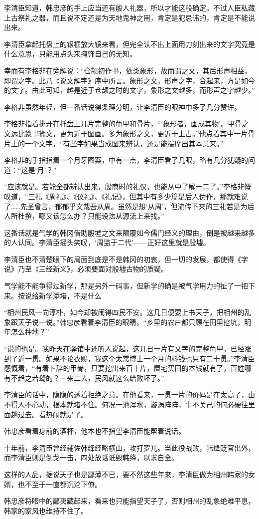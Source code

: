 李清臣知道，韩忠彦的手上应当还有殷人礼器，所以才能这般确定。不过人臣私藏上古祭礼之器，而且说不定还是为天地鬼神之用，肯定是犯忌讳的，肯定是不能说出来。

李清臣拿起托盘上的银框放大镜来看，但完全认不出上面用刀刻出来的文字究竟是什么意思，只能用点头来掩饰自己的无知。

幸而有李格非在旁解说：“仓颉初作书，依类象形，故而谓之文，其后形声相益，即谓之字。此乃《说文解字》序中所言。象形之文，形声之字，合起来，方是如今的文字。由此可知，越是近于仓颉之时的文字，象形之文越多，而形声之字越少。”

李格非虽然年轻，但一番话说得条理分明，让李清臣的眼神中多了几分赞许。

李格非指着排开在托盘上几片完整的龟甲和骨片，“‘象形者，画成其物’。甲骨之文远比篆书籀文，更为近于图画。多为象形之文，更近于上古。”他点着其中一片骨片上的一个文字，“有些字如果当成图来辨认，还是能揣摩出其本意来。”

李格非的手指指着一个月牙图案，中有一点，李清臣看了几眼，略有几分犹疑的问道：“这是‘月’？”

“应该就是。若能全都辨认出来，殷商时的礼仪，也能从中了解一二了。”李格非慨叹道，“三礼《周礼》、《仪礼》、《礼记》，但其中有多少篇是后人伪作，那就难说了……先圣曾言，郁郁乎文哉吾从周。虽然是想‘从周’，但流传下来的三礼若是为后人所杜撰，哪又该怎么办？只能设法从源流上来找。”

这番话就是气学的韩冈借助殷墟之文来颠覆如今儒门经义的理由，倒是被越来越多的人认同。李清臣摇头笑叹，‘周监于二代’——正好这里就是殷墟。

李清臣也不清楚眼下的局面到底是不是韩冈的初衷，但一切的发展，都使得《字说》乃至《三经新义》，必须要面对殷墟古物的质疑。

气学能不能争得过新学，那是另外一码事，但新学的确是被气学用力的扯了一把下来。按说给新学添堵，不是什么

“相州民风一向淳朴，如今却被闹得四民不安。这几日便要上书天子，把相州的乱象跟天子说一说。”韩忠彦看着李清臣的眼睛，“乡里的农户都只顾在田里挖坑，明年怎么种地？”

“说的也是。我昨天在驿馆中还听人说起，这几日一片有文字的完整龟甲，已经涨到了近一贯。如果不论衣赐，我这个太常博士一个月的料钱也只有二十贯。”李清臣感慨着，“有着卜辞的甲骨，只要挖出来百十片，置宅买田的本钱就有了，百姓哪有不趋之若鹜的？一来二去，民风就这么给败坏了。”

李清臣的话中，隐隐的透着拒绝之意。在他看来，一贯一片的价码是在太高了，由不得人不心动，根本就堵不住。何况一池浑水，漩涡阵阵，事不关己的何必硬往里面趟过去。看热闹就是了。

韩忠彦看着身前的酒杯，他本也不指望李清臣能帮着说话。

十年前，李清臣曾经辅佐韩绛经略横山，攻打罗兀。当此役战败，韩绛贬官出外，而李清臣则是倒戈一击，四处放话诋毁韩绛，以求自全。

这样的人品，据说天子也是鄙薄不已，要不然这些年来，李清臣做为相州韩家的女婿，也不至于一直都沉沦下僚。

韩忠彦将眼中的鄙夷藏起来，看来也只能指望天子了，否则相州的乱象绝难平息，韩家的家风也维持不住了。

